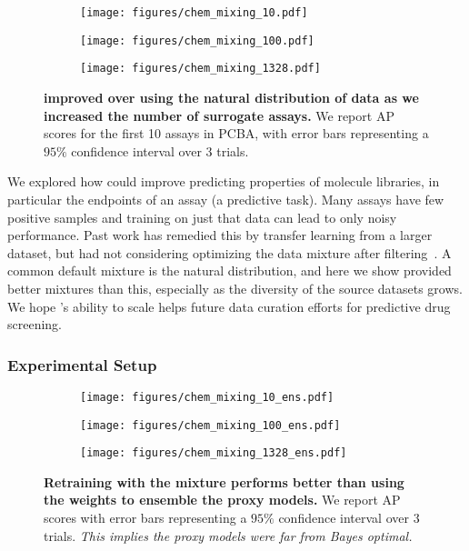 \begin{figure*}[t]
\centering
\begin{subfigure}
    \centering
    \texttt{[image: figures/chem\_mixing\_10.pdf]}
    \label{fig:chem_10}
\end{subfigure}%
\begin{subfigure}
    \centering
    \texttt{[image: figures/chem\_mixing\_100.pdf]}
    \label{fig:chem_100}
\end{subfigure}
\begin{subfigure}
    \centering
    \texttt{[image: figures/chem\_mixing\_1328.pdf]}
    \label{fig:chem_1328}
\end{subfigure}%
\caption{\textbf{\method improved over using the natural distribution of data as we increased the number of surrogate assays.} We report AP scores for the first 10 assays in PCBA, with error bars representing a $95\%$ confidence interval over $3$ trials.}
\label{fig:chem_scale}
\end{figure*}


We explored how \method could improve predicting properties of molecule libraries, in particular the endpoints of an assay (a predictive task). Many assays have few positive samples and training on just that data can lead to only noisy performance. Past work has remedied this by transfer learning from a larger dataset, but had not considering optimizing the data mixture after filtering~\citep{salem2020transcreen,li2022improving, sun2022feature, ye2018integrated}. A common default mixture is the natural distribution, and here we show \method provided better mixtures than this, especially as the diversity of the source datasets grows. We hope \methodnospace's ability to scale helps future data curation efforts for predictive drug screening.







\subsubsection{Experimental Setup} 
\begin{figure*}[t!]
\centering
\begin{subfigure}
    \centering
    \texttt{[image: figures/chem\_mixing\_10\_ens.pdf]}
    \label{fig:chem_10_ens}
\end{subfigure}%
\begin{subfigure}
    \centering
    \texttt{[image: figures/chem\_mixing\_100\_ens.pdf]}
    \label{fig:chem_100_ens}
\end{subfigure}
\begin{subfigure}
    \centering
    \texttt{[image: figures/chem\_mixing\_1328\_ens.pdf]}
    \label{fig:chem_1328_ens}
\end{subfigure}%
\caption{\textbf{Retraining with the \method mixture performs better than using the \method weights to ensemble the proxy models.} We report AP scores with error bars representing a $95\%$ confidence interval over $3$ trials. \emph{This implies the proxy models were far from Bayes optimal.}}
\label{fig:chem_ens}
\end{figure*}


